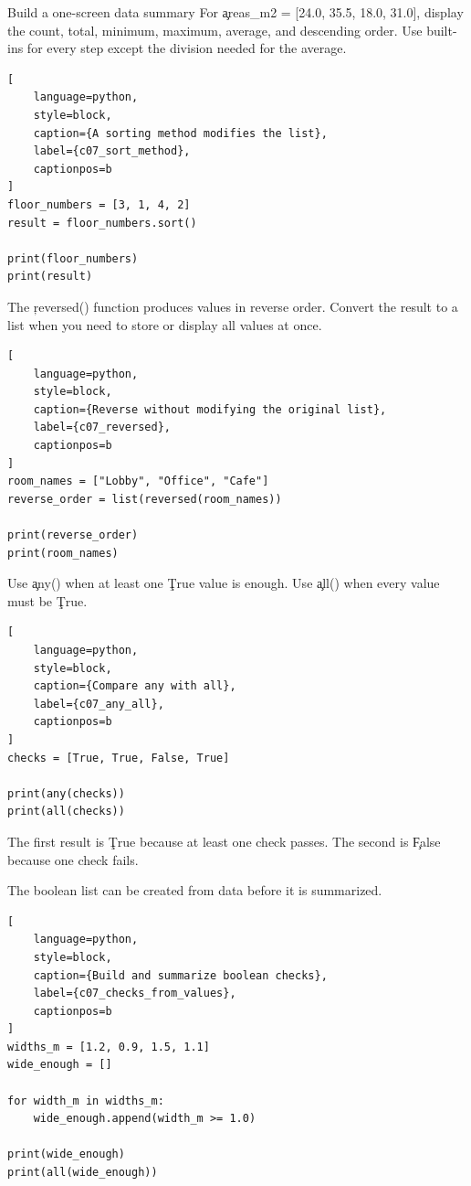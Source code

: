 \begin{TryBox}{Build a one-screen data summary}
For \c{areas_m2 = [24.0, 35.5, 18.0, 31.0]}, display the count, total,
minimum, maximum, average, and descending order. Use built-ins for every step
except the division needed for the average.
\end{TryBox}

\begin{lstlisting}[
    language=python,
    style=block,
    caption={A sorting method modifies the list},
    label={c07_sort_method},
    captionpos=b
]
floor_numbers = [3, 1, 4, 2]
result = floor_numbers.sort()

print(floor_numbers)
print(result)
\end{lstlisting}


The \c{reversed()} function produces values in reverse order. Convert the
result to a list when you need to store or display all values at once.

\begin{lstlisting}[
    language=python,
    style=block,
    caption={Reverse without modifying the original list},
    label={c07_reversed},
    captionpos=b
]
room_names = ["Lobby", "Office", "Cafe"]
reverse_order = list(reversed(room_names))

print(reverse_order)
print(room_names)
\end{lstlisting}


Use \c{any()} when at least one \c{True} value is enough. Use \c{all()} when
every value must be \c{True}.

\begin{lstlisting}[
    language=python,
    style=block,
    caption={Compare any with all},
    label={c07_any_all},
    captionpos=b
]
checks = [True, True, False, True]

print(any(checks))
print(all(checks))
\end{lstlisting}

The first result is \c{True} because at least one check passes. The second is
\c{False} because one check fails.

The boolean list can be created from data before it is summarized.

\begin{lstlisting}[
    language=python,
    style=block,
    caption={Build and summarize boolean checks},
    label={c07_checks_from_values},
    captionpos=b
]
widths_m = [1.2, 0.9, 1.5, 1.1]
wide_enough = []

for width_m in widths_m:
    wide_enough.append(width_m >= 1.0)

print(wide_enough)
print(all(wide_enough))
\end{lstlisting}

